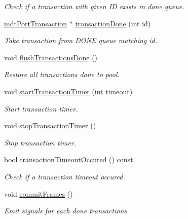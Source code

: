 \begin{DoxyCompactItemize}
\begin{DoxyCompactList}\small\item\em Check if a transaction with given ID exists in done queue. \end{DoxyCompactList}\item 
\hyperlink{classmdt_port_transaction}{mdtPortTransaction} $\ast$ \hyperlink{classmdt_port_manager_a5869bcf6774a86fb9d3b00a0d4211bb5}{transactionDone} (int id)
\begin{DoxyCompactList}\small\item\em Take transaction from DONE queue matching id. \end{DoxyCompactList}\item 
\hypertarget{classmdt_port_manager_aad801de5f93a3619d98b7ea3cae6b999}{
void \hyperlink{classmdt_port_manager_aad801de5f93a3619d98b7ea3cae6b999}{flushTransactionsDone} ()}
\label{classmdt_port_manager_aad801de5f93a3619d98b7ea3cae6b999}

\begin{DoxyCompactList}\small\item\em Restore all transactions done to pool. \end{DoxyCompactList}\item 
void \hyperlink{classmdt_port_manager_adeeba5a216174fcc1d01446a9537f40e}{startTransactionTimer} (int timeout)
\begin{DoxyCompactList}\small\item\em Start transaction timer. \end{DoxyCompactList}\item 
void \hyperlink{classmdt_port_manager_a1467c0bd28612ae3116f5daba08c0b84}{stopTransactionTimer} ()
\begin{DoxyCompactList}\small\item\em Stop transaction timer. \end{DoxyCompactList}\item 
bool \hyperlink{classmdt_port_manager_a04fc12f0dc02e981cac8dc56539e63d2}{transactionTimeoutOccured} () const 
\begin{DoxyCompactList}\small\item\em Check if a transaction timeout occured. \end{DoxyCompactList}\item 
void \hyperlink{classmdt_port_manager_a84d37b380080eb26e56c68424dedd958}{commitFrames} ()
\begin{DoxyCompactList}\small\item\em Emit signals for each done transactions. \end{DoxyCompactList}\end{DoxyCompactItemize}
